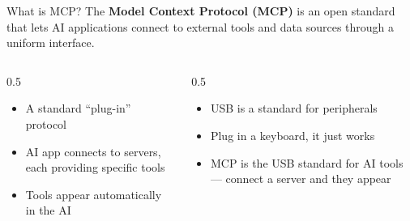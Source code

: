 \documentclass[aspectratio=169]{beamer}
\begin{document}
\begin{frame}{What is MCP?}
The \textbf{Model Context Protocol (MCP)} is an open standard that lets AI applications connect to external tools and data sources through a uniform interface.
\vspace{0.3cm}
\begin{columns}[T]
\begin{column}{0.5\textwidth}
\begin{shadedbox}[title=\textbf{The Idea}]
\begin{itemize}\small
  \item A standard ``plug-in'' protocol
  \item AI app connects to servers, each providing specific tools
  \item Tools appear automatically in the AI
\end{itemize}
\end{shadedbox}
\end{column}
\begin{column}{0.5\textwidth}
\begin{shadedbox}[title=\textbf{Analogy}]
\begin{itemize}\small
  \item USB is a standard for peripherals
  \item Plug in a keyboard, it just works
  \item MCP is the USB standard for AI tools --- connect a server and they appear
\end{itemize}
\end{shadedbox}
\end{column}
\end{columns}
\end{frame}
\end{document}

